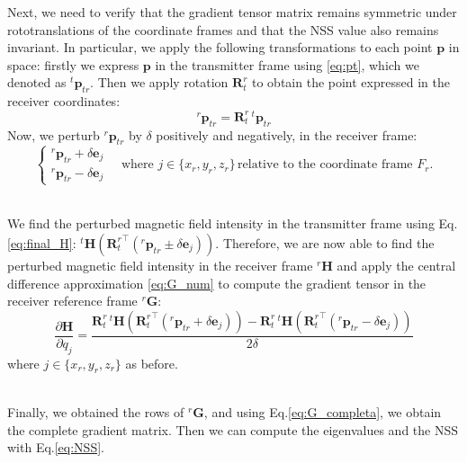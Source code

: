 \documentclass[main]{subfiles}
\begin{document}
\noindent
Next, we need to verify that the gradient tensor matrix remains symmetric under 
rototranslations of the coordinate frames and that the NSS value also remains invariant.
In particular, we apply the following transformations to each point $\mathbf{p}$ in space:
firstly we express $\mathbf{p}$ in the transmitter frame using \ref{eq:pt}, which we denoted as 
${}^t \mathbf{p}_{tr}$.
Then we apply rotation $\mathbf{R}^r_t$ to obtain the point expressed in the receiver coordinates:
\begin{equation}
   {}^r \mathbf{p}_{tr}  = \mathbf{R}^r_t \, {}^t \mathbf{p}_{tr}
   \label{eq:p__in_receiver}
\end{equation}
Now, we perturb ${}^r \mathbf{p}_{tr}$ by $\delta$ positively and negatively, in the receiver frame:
\[
\begin{cases}
    {}^r \mathbf{p}_{tr} + \delta \mathbf{e}_j \\
    {}^r \mathbf{p}_{tr} - \delta \mathbf{e}_j
\end{cases} 
\quad \text{where } j \in \{ x_r, y_r, z_r \} \, \text{relative to the coordinate frame } F_r.
\]

\noindent\\
We find the perturbed magnetic field intensity in the transmitter frame using Eq. \ref{eq:final_H}:
${}^t \mathbf{H} ( {\mathbf{R}^r_t}^\top ({}^r \mathbf{p}_{tr} \pm \delta \mathbf{e}_j) )$.
Therefore, we are now able to find the perturbed magnetic field intensity in the receiver frame
${}^r \mathbf{H}$ and apply the central difference approximation 
\eqref{eq:G_num} to compute the gradient tensor in the receiver reference frame 
${}^r \mathbf{G}$:
\begin{equation}
    \frac{\partial \mathbf{H}}{\partial q_j} = 
    \frac{
    \mathbf{R}^r_t \, {}^t \mathbf{H} ( {\mathbf{R}^r_t}^\top ({}^r \mathbf{p}_{tr} + \delta \mathbf{e}_j) )
    - \mathbf{R}^r_t \, {}^t \mathbf{H} ( {\mathbf{R}^r_t}^\top ({}^r \mathbf{p}_{tr} - \delta \mathbf{e}_j) )}
    {2 \delta}
\end{equation}
where $j \in \{ x_r, y_r, z_r \}$ as before.

\noindent\\
Finally, we obtained the rows of ${}^r \mathbf{G}$, and using Eq.\ref{eq:G_completa}, 
we obtain the complete gradient matrix. Then we can compute the eigenvalues and the NSS
with Eq.\ref{eq:NSS}.
\end{document}
